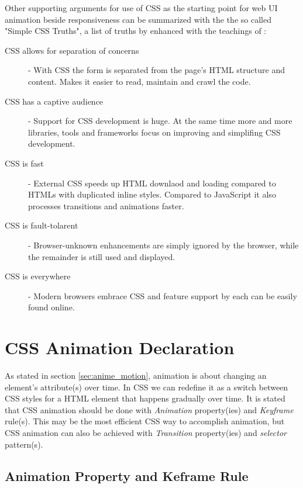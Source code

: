 Other supporting arguments for use of CSS as the starting point for web UI animation beside responsiveness can be summarized with the the so called "Simple CSS Truths", a list of truths by \citet{palermoCSS} enhanced with the teachings of \citet{IAWEB}:

\begin{description}
\item [CSS allows for separation of concerns] -
 With CSS the form is separated from the page's HTML structure and content. Makes it easier to read, maintain and crawl the code.

\item [CSS has a captive audience] -
 Support for CSS development is huge. At the same time more and more libraries, tools and frameworks focus on improving and simplifing CSS development. 

\item [CSS is fast] - 
 External CSS speeds up HTML downlaod and loading compared to HTMLs with duplicated inline styles. Compared to JavaScript it also processes transitions and animations faster.

\item [CSS is fault-tolarent] - 
 Browser-unknown enhancements are simply ignored by the browser, while the remainder is still used and displayed.

\item [CSS is everywhere] - 
 Modern browsers embrace CSS and feature support by each can be easily found online.
\end{description}


\section{CSS Animation Declaration} %
\label{sec:declarationCSS}

As stated in section \ref{sec:anime_motion}, animation is about changing an element's attribute(s) over time. In CSS we can redefine it as a switch between CSS styles for a HTML element that happens gradually over time. It is stated that CSS animation should be done with {\em{}Animation} property(ies) and {\em{}Keyframe} rule(s). This may be the most efficient CSS way to accomplish animation, but CSS animation can also be achieved with {\em{}Transition} property(ies) and {\em{}selector} pattern(s)\citep{w3schoolAnime,w3schoolTrans}.


\subsection{Animation Property and Keframe Rule} %
\label{sub:CSS_animation_keyframe}

